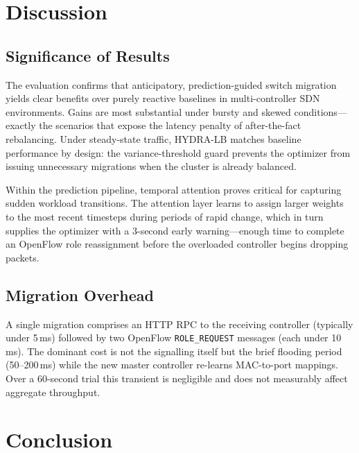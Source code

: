 \documentclass[conference]{IEEEtran}
\begin{document}
\section{Discussion}

\subsection{Significance of Results}

The evaluation confirms that anticipatory, prediction-guided switch migration yields clear benefits over purely reactive baselines in multi-controller SDN environments. Gains are most substantial under bursty and skewed conditions---exactly the scenarios that expose the latency penalty of after-the-fact rebalancing. Under steady-state traffic, HYDRA-LB matches baseline performance by design: the variance-threshold guard prevents the optimizer from issuing unnecessary migrations when the cluster is already balanced.

Within the prediction pipeline, temporal attention proves critical for capturing sudden workload transitions. The attention layer learns to assign larger weights to the most recent timesteps during periods of rapid change, which in turn supplies the optimizer with a 3-second early warning---enough time to complete an OpenFlow role reassignment before the overloaded controller begins dropping packets.

\subsection{Migration Overhead}

A single migration comprises an HTTP RPC to the receiving controller (typically under 5\,ms) followed by two OpenFlow \texttt{ROLE\_REQUEST} messages (each under 10\,ms). The dominant cost is not the signalling itself but the brief flooding period (50--200\,ms) while the new master controller re-learns MAC-to-port mappings. Over a 60-second trial this transient is negligible and does not measurably affect aggregate throughput.

\section{Conclusion}
\end{document}
